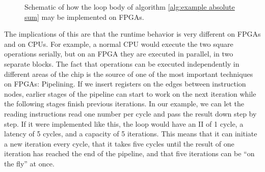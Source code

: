 \begin{figure}
    \centering
    \caption{Schematic of how the loop body of algorithm \ref{alg:example absolute sum} may be implemented on \acp{FPGA}.}
    \label{fig:example absolute sum}
\end{figure}

The implications of this are that the runtime behavior is very different on \acp{FPGA} and on \acp{CPU}. For example, a normal \ac{CPU} would execute the two square operations serially, but on an \ac{FPGA} they are executed in parallel, in two separate blocks. The fact that operations can be executed independently in different areas of the chip is the source of one of the most important techniques on \acp{FPGA}: Pipelining. If we insert registers on the edges between instruction nodes, earlier stages of the pipeline can start to work on the next iteration while the following stages finish previous iterations. In our example, we can let the reading instructions read one number per cycle and pass the result down step by step. If it were implemented like this, the loop would have an \ac{II} of 1 cycle, a latency of 5 cycles, and a capacity of 5 iterations. This means that it can initiate a new iteration every cycle, that it takes five cycles until the result of one iteration has reached the end of the pipeline, and that five iterations can be ``on the fly'' at once.

